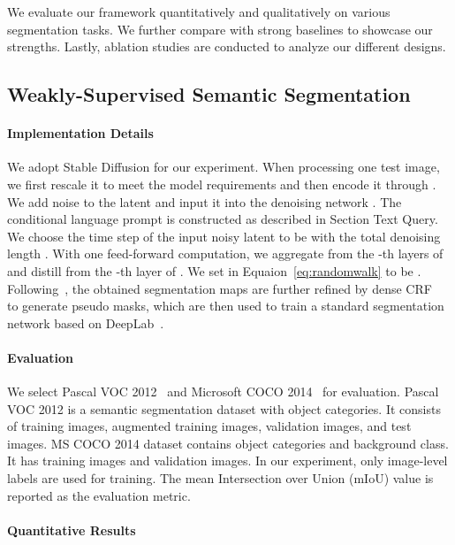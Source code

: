 \documentclass[letterpaper]{article} \usepackage[submission]{aaai24}  \usepackage{times}  \usepackage{helvet}  \usepackage{courier}  \usepackage[hyphens]{url}  \usepackage{graphicx} \urlstyle{rm} \def\UrlFont{\rm}  \usepackage{natbib}  \usepackage{caption} \frenchspacing  \setlength{\pdfpagewidth}{8.5in} \setlength{\pdfpageheight}{11in} \usepackage{algorithm}
\begin{document}
We evaluate our framework quantitatively and qualitatively on various segmentation tasks.
We further compare with strong baselines to showcase our strengths.
Lastly, ablation studies are conducted to analyze our different designs.

\subsection{Weakly-Supervised Semantic Segmentation}
\label{sec:wsss}

\paragraph{Implementation Details}

We adopt Stable Diffusion for our experiment.
When processing one test image, we first rescale it to meet the model requirements and then encode it through .
We add noise to the latent and input it into the denoising network .
The conditional language prompt  is constructed as described in Section Text Query.
We choose the time step  of the input noisy latent  to be  with the total denoising length .
With one feed-forward computation, we aggregate  from the -th layers of  and distill  from the -th layer of .
We set  in Equaion~\ref{eq:randomwalk} to be .
Following~\cite{clims, CLIP-ES}, the obtained segmentation maps are further refined by dense CRF~\cite{dCRF} to generate pseudo masks, which are then used to train a standard segmentation network based on DeepLab~\cite{DeepLab}.






\paragraph{Evaluation}

We select Pascal VOC 2012~\cite{pascalvoc} and Microsoft COCO 2014~\cite{mscoco} for evaluation. 
Pascal VOC 2012 is a semantic segmentation dataset with  object categories.
It consists of  training images,  augmented training images,  validation images, and  test images.
MS COCO 2014 dataset contains  object categories and  background class.
It has  training images and  validation images.
In our experiment, only image-level labels are used for training.
The mean Intersection over Union (mIoU) value is reported as the evaluation metric.

\paragraph{Quantitative Results}
\end{document}
